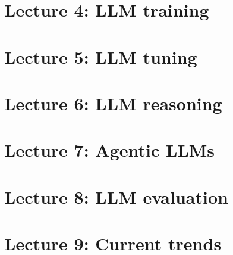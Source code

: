 \documentclass[a4paper]{article}
\begin{document}
\section{Lecture 4: LLM training}


\section{Lecture 5: LLM tuning}


\section{Lecture 6: LLM reasoning}


\section{Lecture 7: Agentic LLMs}


\section{Lecture 8: LLM evaluation}


\section{Lecture 9: Current trends}

\end{document}
